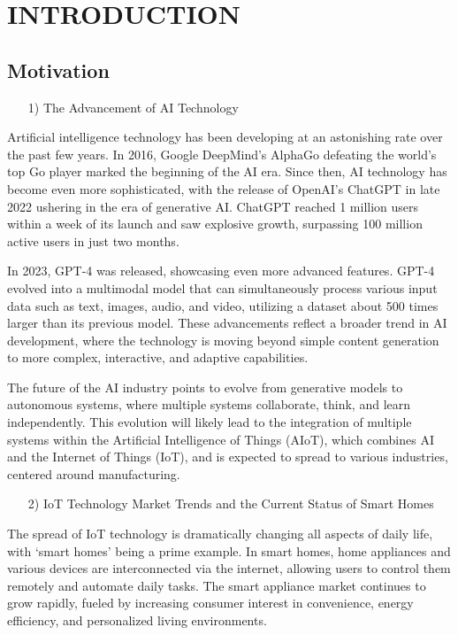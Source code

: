 \documentclass[conference]{IEEEtran}
\begin{document}
\clearpage
    
\section{INTRODUCTION}

\subsection{Motivation}

\begin{itemize}
    \item [1)] The Advancement of AI Technology
\end{itemize}
     \hspace{0.5em} Artificial intelligence technology has been developing at an astonishing rate over the past few years. In 2016, Google DeepMind's AlphaGo defeating the world's top Go player marked the beginning of the AI era. Since then, AI technology has become even more sophisticated, with the release of OpenAI's ChatGPT in late 2022 ushering in the era of generative AI. ChatGPT reached 1 million users within a week of its launch and saw explosive growth, surpassing 100 million active users in just two months.

    \hspace{0.5em} In 2023, GPT-4 was released, showcasing even more advanced features. GPT-4 evolved into a multimodal model that can simultaneously process various input data such as text, images, audio, and video, utilizing a dataset about 500 times larger than its previous model. These advancements reflect a broader trend in AI development, where the technology is moving beyond simple content generation to more complex, interactive, and adaptive capabilities.
    
    \hspace{0.5em} The future of the AI industry points to evolve from generative models to autonomous systems, where multiple systems collaborate, think, and learn independently. This evolution will likely lead to the integration of multiple systems within the Artificial Intelligence of Things (AIoT), which combines AI and the Internet of Things (IoT), and is expected to spread to various industries, centered around manufacturing. \\
\begin{itemize}
    \item [2)] IoT Technology Market Trends and the Current Status of Smart Homes
\end{itemize}
    \hspace{0.5em} The spread of IoT technology is dramatically changing all aspects of daily life, with `smart homes' being a prime example. In smart homes, home appliances and various devices are interconnected via the internet, allowing users to control them remotely and automate daily tasks.  The smart appliance market continues to grow rapidly, fueled by increasing consumer interest in convenience, energy efficiency, and personalized living environments. 
\end{document}

